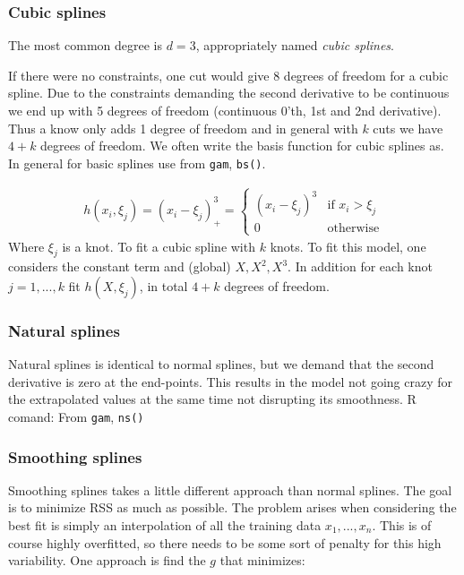 \documentclass{article}
\begin{document}
\subsubsection{Cubic splines}
The most common degree is $d=3$, appropriately named \textit{cubic splines}. 

If there were no constraints, one cut would give 8 degrees of freedom for a cubic spline. Due to the constraints demanding the second derivative to be continuous we end up with 5 degrees of freedom (continuous 0'th, 1st and 2nd derivative). Thus a know only adds 1 degree of freedom and in general with $k$ cuts we have $4+k$ degrees of freedom. We often write the basis function for cubic splines as. In general for basic splines use from \texttt{gam}, \texttt{bs()}.

\begin{align*}
    h(x_i, \xi_j) = (x_i-\xi_j)^3_+ = \left\{
	\begin{array}{ll}
		(x_i-\xi_j)^3  & \mbox{if } x_i > \xi_j \\
		0 &  \text{otherwise}
	\end{array}
\right.
\end{align*}
Where $\xi_j$ is a knot. To fit a cubic spline with $k$ knots. To fit this model, one considers the constant term and (global) $X, X^2, X^3$. In addition for each knot $j = 1, ..., k$ fit $h(X, \xi_j)$, in total $4+k$ degrees of freedom. 


\subsubsection{Natural splines}
Natural splines is identical to normal splines, but we demand that the second derivative is zero at the end-points. This results in the model not going crazy for the extrapolated values at the same time not disrupting its smoothness. R comand: From \texttt{gam}, \texttt{ns()}

\subsubsection{Smoothing splines}
Smoothing splines takes a little different approach than normal splines. The goal is to minimize RSS as much as possible. The problem arises when considering the best fit is simply an interpolation of all the training data $x_1, ... , x_n$. This is of course highly overfitted, so there needs to be some sort of penalty for this high variability. One approach is find the $g$ that minimizes: 
\end{document}
